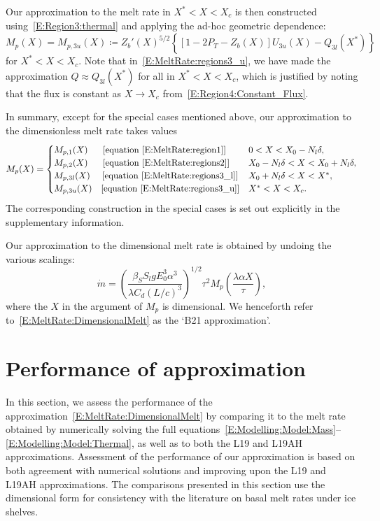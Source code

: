 \documentclass[openacc]{rsproca_new}%
\newcommand{\lt}{\delta} %
\newcommand{\Pt}{\textit{P}_T}
\begin{document}
Our approximation to the melt rate in $X^* < X <X_c$ is then constructed using~\eqref{E:Region3:thermal} and applying the ad-hoc geometric dependence:
\begin{equation}\label{E:MeltRate:regions3_u}
M_p(X) = M_{p,3u}(X) \coloneqq Z_b'(X)^{5/2}\left\{ \left[1  - 2\Pt -  Z_b(X)\right] U_{3u}(X) - Q_{3l}(X^*) \right\}
\end{equation}
for $X^* < X < X_c$. Note that in~\eqref{E:MeltRate:regions3_u}, we have made the approximation $Q \approx Q_{3l}(X^*)$ for all in $X^* < X < X_c$, which is justified by noting that the flux is constant as $X \to X_c$ from~\eqref{E:Region4:Constant_Flux}.

In summary, except for the special cases mentioned above, our approximation to the dimensionless melt rate takes values
\begin{equation}\label{E:MeltRate:AllRegions}
M_{p}(X) = \begin{cases} 
M_{p,1}(X) \text{~~\quad [equation~\eqref{E:MeltRate:region1}]}  & 0 < X < X_0 - N_l \lt,\\
M_{p,2}(X) \text{~~\quad [equation~\eqref{E:MeltRate:regions2}]} & X_0 - N_l \lt < X < X_0 + N_l \lt,\\
M_{p,3l}(X) \text{~\quad [equation~\eqref{E:MeltRate:regions3_l}]} & X_0 + N_l \lt < X < X^*,\\
M_{p,3u}(X) \text{\quad [equation~\eqref{E:MeltRate:regions3_u}]} & X^* < X < X_c.
\end{cases}
\end{equation}
The corresponding construction in the special cases is set out explicitly in the supplementary information.

Our approximation to the dimensional melt rate is obtained by undoing the various scalings:
\begin{equation}\label{E:MeltRate:DimensionalMelt}
\dot{m} =\left(\frac{\beta_S S_l g  E_0^3 \alpha^3}{\lambda C_d (L/c)^3}\right)^{1/2} \tau^2  M_p\left(\frac{\lambda \alpha X}{\tau}\right),
\end{equation}
where the $X$ in the argument of $M_p$ is dimensional. We henceforth refer to~\eqref{E:MeltRate:DimensionalMelt} as the `B21 approximation'.

\section{Performance of approximation}\label{S:Numerics}
In this section, we assess the performance of the approximation~\eqref{E:MeltRate:DimensionalMelt} by comparing it to the melt rate obtained by numerically solving the full equations~\eqref{E:Modelling:Model:Mass}--\eqref{E:Modelling:Model:Thermal}, as well as to both the L19 and L19AH approximations. Assessment of the performance of our approximation is based on both agreement with numerical solutions and improving upon the L19 and L19AH approximations. The comparisons presented in this section use the dimensional form for consistency with the literature on basal melt rates under ice shelves.
\end{document}
